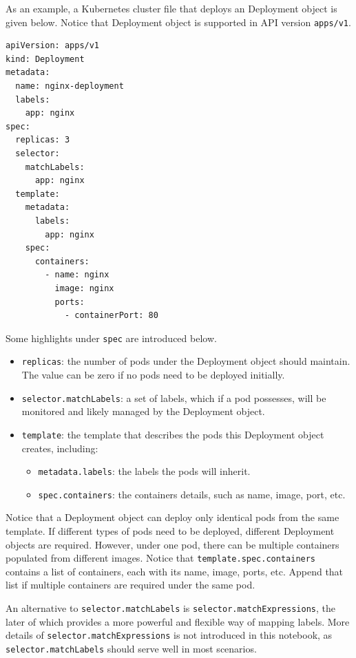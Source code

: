 As an example, a Kubernetes cluster file that deploys an Deployment object is given below. Notice that Deployment object is supported in API version \verb|apps/v1|.
\begin{lstlisting}
apiVersion: apps/v1
kind: Deployment
metadata:
  name: nginx-deployment
  labels:
    app: nginx
spec:
  replicas: 3
  selector:
    matchLabels:
      app: nginx
  template:
    metadata:
      labels:
        app: nginx
    spec:
      containers:
        - name: nginx
          image: nginx
          ports:
            - containerPort: 80

\end{lstlisting}
Some highlights under \verb|spec| are introduced below.
\begin{itemize}
	\item \verb|replicas|: the number of pods under the Deployment object should maintain. The value can be zero if no pods need to be deployed initially.
	\item \verb|selector.matchLabels|: a set of labels, which if a pod possesses, will be monitored and likely managed by the Deployment object.
	\item \verb|template|: the template that describes the pods this Deployment object creates, including:
    \begin{itemize}
      \item \verb|metadata.labels|: the labels the pods will inherit.
      \item \verb|spec.containers|: the containers details, such as name, image, port, etc.
    \end{itemize}
\end{itemize}
Notice that a Deployment object can deploy only identical pods from the same template. If different types of pods need to be deployed, different Deployment objects are required. However, under one pod, there can be multiple containers populated from different images. Notice that \texttt{template.spec.containers} contains a list of containers, each with its name, image, ports, etc. Append that list if multiple containers are required under the same pod.

An alternative to \texttt{selector.matchLabels} is \texttt{selector.matchExpressions}, the later of which provides a more powerful and flexible way of mapping labels. More details of \texttt{selector.matchExpressions} is not introduced in this notebook, as \texttt{selector.matchLabels} should serve well in most scenarios.

